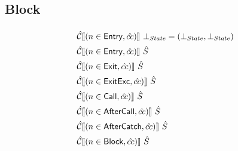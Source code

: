 \subsection{Block}
\[
\renewcommand\arraystretch{1.5}
\begin{array}{l}

\aC \lbr (n \in \SF{Entry}, \hat{cc}) \rbr\ \bot_{State} = (\bot_{State}, \bot_{State}) \\
\aC \lbr (n \in \SF{Entry}, \hat{cc}) \rbr\ \hat{S} \\
\aC \lbr (n \in \SF{Exit}, \hat{cc}) \rbr\ \hat{S} \\
\aC \lbr (n \in \SF{ExitExc}, \hat{cc}) \rbr\ \hat{S} \\
\aC \lbr (n \in \SF{Call}, \hat{cc}) \rbr\ \hat{S} \\
\aC \lbr (n \in \SF{AfterCall}, \hat{cc}) \rbr\ \hat{S} \\
\aC \lbr (n \in \SF{AfterCatch}, \hat{cc}) \rbr\ \hat{S} \\
\aC \lbr (n \in \SF{Block}, \hat{cc}) \rbr\ \hat{S} \\

\end{array}
\]

